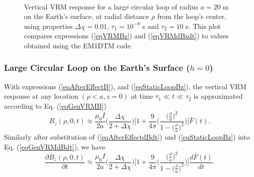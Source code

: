 \documentclass[journal]{IEEEtran}  %
\begin{document}
\begin{figure}[!b]
    \centering
    \vspace{-10pt}
    \\
    \vspace{-10pt}
    \caption{Vertical VRM response
     for a large circular loop of radius $a=20$ m on the Earth's surface,
     at radial distance $\rho$ from the loop's center,
     using properties $\Delta \chi=0.01$,
     $\tau_1 = 10^{-8}$ s and $\tau_2=10$ s.
     This plot compares expressions (\ref{eqVRMBz}) and (\ref{eqVRMdBzdt})
     to values obtained using the EM1DTM code.}
    \label{figVRMrespZ}
\end{figure}
%

\subsubsection{Large Circular Loop on the Earth's Surface ($h=0$)}
\label{secVertVRMresp} With expressions (\ref{eqAfterEffectB}),
and (\ref{eqStaticLoopBz}), the vertical VRM response at any location 
$(\rho < a,z=0)$ at time $\tau_1 \ll t \ll \tau_2$ is approximated 
according to Eq. (\ref{eqGenVRMB})
\begin{equation}
B_z(\rho,0,t) \approx \frac{\mu_0 I}{2a} \Bigg ( \frac{\Delta
\chi}{2+\Delta \chi} \Bigg )  \Bigg [ 1 + \frac{9}{4\pi} \Bigg (
\frac{\big( \frac{\rho}{a} \big )^2}{1- \big( \frac{\rho}{a} \big
)^2} \Bigg ) \Bigg ] \bar F(t). \label{eqVRMBz}
\end{equation}
Similarly after substitution of (\ref{eqAfterEffectdBdt}) and (\ref{eqStaticLoopBz})
into Eq. (\ref{eqGenVRMdBdt}), we have
\begin{equation} \frac{\partial B_z(\rho,0,t)}{\partial t}  \approx
\frac{\mu_0 I}{2a} \Bigg ( \frac{\Delta \chi}{2+\Delta \chi} \Bigg )
\Bigg [ 1 + \frac{9}{4\pi} \Bigg ( \frac{\big( \frac{\rho}{a} \big
)^2}{1- \big( \frac{\rho}{a} \big )^2} \Bigg ) \Bigg ] \frac{d \bar
F(t)}{dt}. \label{eqVRMdBzdt}
\end{equation}
\end{document}

